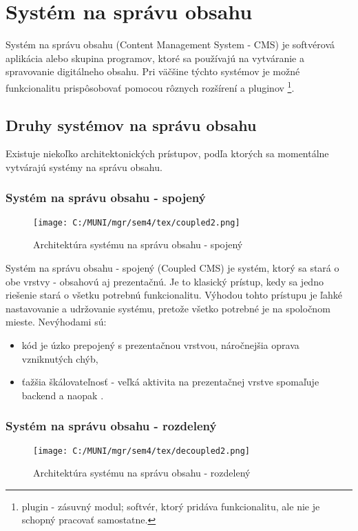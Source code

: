 \documentclass[
  printed, %
  table,   %
  lof,     %
  nolot,     %
  twoside,  
]{fithesis3}
\begin{document}
\chapter{Systém na správu obsahu}
Systém na správu obsahu (Content Management System - CMS) je softvérová aplikácia alebo skupina programov, ktoré sa používajú na vytváranie a spravovanie digitálneho obsahu. Pri väčšine týchto systémov je možné funkcionalitu prispôsobovať pomocou rôznych rozšírení a pluginov \footnote{plugin - zásuvný modul; softvér, ktorý pridáva funkcionalitu, ale nie je schopný pracovať samostatne.}.
\section{Druhy systémov na správu obsahu}
Existuje niekoľko architektonických prístupov, podľa ktorých sa momentálne vytvárajú systémy na správu obsahu.
\subsection{Systém na správu obsahu - spojený}
\begin{figure}[h]
  \begin{center}
        \texttt{[image: C:/MUNI/mgr/sem4/tex/coupled2.png]}
  \end{center}
  \caption{Architektúra systému na správu obsahu - spojený}
  \label{fig:coupled}
\end{figure}

Systém na správu obsahu - spojený (Coupled CMS) je systém, ktorý sa stará o obe vrstvy - obsahovú aj prezentačnú. Je to klasický prístup, kedy sa jedno riešenie stará o všetku potrebnú funkcionalitu. 
Výhodou tohto prístupu je ľahké nastavovanie a udržovanie systému, pretože všetko potrebné je na spoločnom mieste. Nevýhodami sú: 
\begin{itemize}
 \item kód je úzko prepojený s prezentačnou vrstvou, náročnejšia oprava vzniknutých chýb,
 \item ťažšia škálovateľnosť - veľká aktivita na prezentačnej vrstve spomaľuje backend a naopak \cite{cmsGuide}.
\end{itemize} 


\subsection{Systém na správu obsahu - rozdelený}
\begin{figure}[h]
  \begin{center}
        \texttt{[image: C:/MUNI/mgr/sem4/tex/decoupled2.png]}
  \end{center}
  \caption{Architektúra systému na správu obsahu - rozdelený}
  \label{fig:decoupled}
\end{figure}
\end{document}
